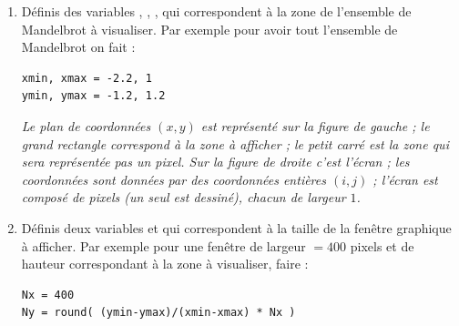 \documentclass[11pt,class=report,crop=false]{standalone}
\begin{document}
\begin{activite}
\begin{enumerate}
  \item Définis des variables , , ,  qui correspondent à la zone de l'ensemble de Mandelbrot à visualiser.
Par exemple pour avoir tout l'ensemble de Mandelbrot on fait :
\begin{lstlisting}
xmin, xmax = -2.2, 1
ymin, ymax = -1.2, 1.2
\end{lstlisting}  



\begin{center}
\begin{minipage}{0.7\textwidth}
\emph{Le plan de coordonnées $(x,y)$ est représenté sur la figure de gauche ; le grand rectangle correspond à la zone à afficher ; le petit carré est la zone qui sera représentée pas un pixel. Sur la figure de droite c'est l'écran ; les coordonnées sont données par des coordonnées entières $(i,j)$ ; l'écran est composé de pixels (un seul est dessiné), chacun de largeur $1$.}
\end{minipage}
\end{center}

\medskip

  \item Définis deux variables  et  qui correspondent à la taille de la fenêtre graphique à afficher.
  Par exemple pour une fenêtre de largeur $= 400$ pixels et de hauteur correspondant à la zone à visualiser, faire :
\begin{lstlisting} 
Nx = 400
Ny = round( (ymin-ymax)/(xmin-xmax) * Nx ) 
\end{lstlisting}  
\end{enumerate} 
\end{activite}




\end{document}

